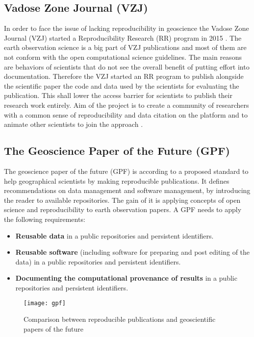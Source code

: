 \documentclass[draft,final]{vutinfth} %
\begin{document}
\subsection{Vadose Zone Journal (VZJ)}\label{VZJ}
In order to face the issue of lacking reproducibility in geoscience the Vadose Zone Journal (VZJ) started a Reproducibility Research (RR) program in 2015 \cite{doi:10.2136/vzj2015.06.0088}. 
The earth observation science is a big part of VZJ publications and most of them are not conform with the open computational science guidelines. The main reasons are behaviors of scientists that do not see the overall benefit of putting effort into documentation. Therefore the VZJ started an RR program to publish alongside the scientific paper the code and data used by the scientists for evaluating the publication. This shall lower the access barrier for scientists to publish their research work entirely. Aim of the project is to create a community of researchers with a common sense of reproducibility and data citation on the platform and to animate other scientists to join the approach \cite{doi:10.2136/vzj2015.06.0088}.

\subsection{The Geoscience Paper of the Future (GPF)}\label{GPF}
The geoscience paper of the future (GPF) is according to \cite{Gil2016TowardTG} a proposed standard to help geographical scientists by making reproducible publications. It defines recommendations on data management and software management, by introducing the reader to available repositories. The gain of it is applying concepts of open science and reproducibility to earth observation papers. A GPF needs to apply the following requirements:

\begin{itemize}
	\item \textbf{Reusable data} in a public repositories and persistent identifiers.
	\item \textbf{Reusable software} (including software for preparing and post editing of the data) in a  public repositories and persistent identifiers.
	\item \textbf{Documenting the computational provenance of results} in a public repositories and persistent identifiers.  
\end{itemize}

\begin{figure}[h]
	\centering
	\texttt{[image: gpf]}
	\caption{Comparison between reproducible publications and geoscientific papers of the future \cite{Gil2016TowardTG}}
	\label{fig:gpf} %
\end{figure}
\end{document}
